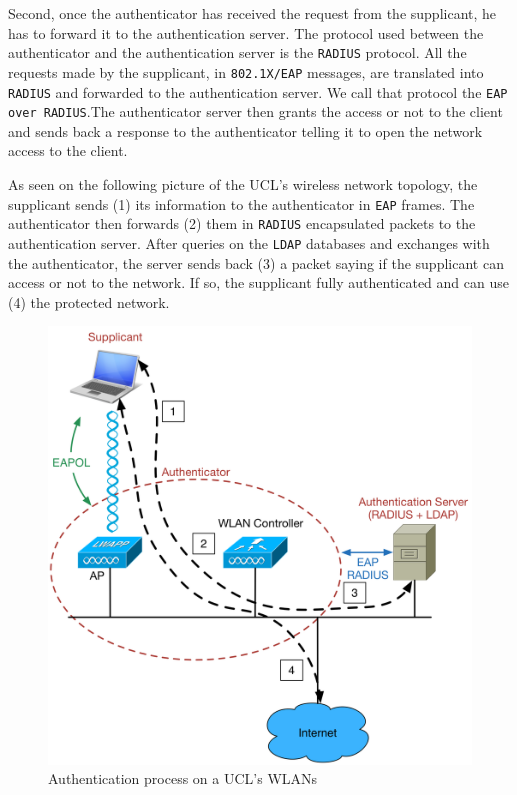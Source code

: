 Second, once the authenticator has received the request from the supplicant, he has to forward it to the authentication server. The protocol used between the authenticator and the authentication server is the \texttt{RADIUS} protocol. All the requests made by the supplicant, in \texttt{802.1X/EAP} messages, are translated into \texttt{RADIUS} and forwarded to the authentication server. We call that protocol the \texttt{EAP over RADIUS}.The authenticator server then grants the access or not to the client and sends back a response to the authenticator telling it to open the network access to the client.


As seen on the following picture of the UCL's wireless network topology, the supplicant sends (1) its information to the authenticator in \texttt{EAP} frames. The authenticator then forwards (2) them in \texttt{RADIUS} encapsulated packets to the authentication server. After queries on the \texttt{LDAP} databases and exchanges with the authenticator, the server sends back (3) a packet saying if the supplicant can access or not to the network. If so, the supplicant fully authenticated and can use (4) the protected network.

\begin{figure}[H]
	\includegraphics[width=.9\linewidth]{Pictures/Chapter2/topology.png}
	\caption{Authentication process on a UCL's WLANs}
\end{figure}


